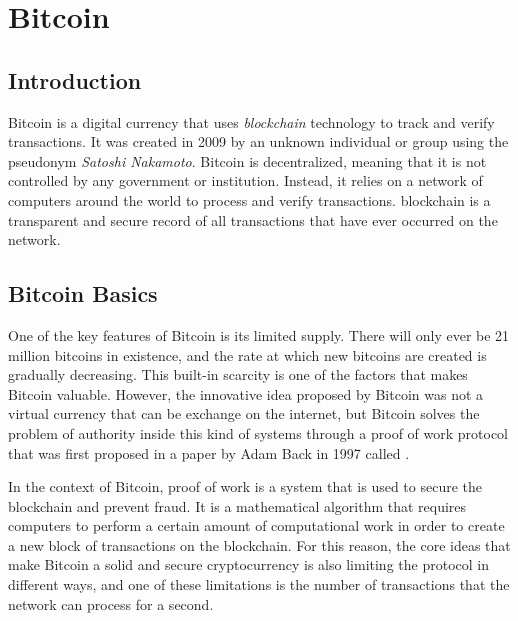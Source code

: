 \newcommand{\noteOnBitcoinNaming}[0]{\footnote{
    From now till the end of the document we will use the word Bitcoin capitalized to identify the protocol,
    and the word bitcoin not capitalized to identify the currency
    }
}

\setcounter{page}{1}
\chapter{Bitcoin}

\section{Introduction}

Bitcoin is a digital currency that uses \emph{blockchain} technology to track
and verify transactions. It was created in 2009 by an unknown individual or
group using the pseudonym \emph{Satoshi Nakamoto}.
Bitcoin is decentralized, meaning that it is not controlled by any government
or institution. Instead, it relies on a network of computers around the world
to process and verify transactions.
blockchain is a transparent and secure record of all transactions that have
ever occurred on the network.

\section{Bitcoin Basics}
\label{sec:basics}

One of the key features of Bitcoin is its limited supply. There will only ever
be 21 million bitcoins in existence, and the rate at which new bitcoins are
created is gradually decreasing. This built-in scarcity is one of the factors
that makes Bitcoin valuable.
However, the innovative idea proposed by Bitcoin was not a virtual currency that can be
exchange on the internet, but Bitcoin solves the problem of authority inside this kind
of systems through a proof of work protocol that was first proposed in a paper
by Adam Back in 1997 called  \cite{hashcash}.

In the context of Bitcoin, proof of work is a system that is used to secure the
blockchain and prevent fraud. It is a mathematical algorithm that requires computers
to perform a certain amount of computational work in order to create a new
block of transactions on the blockchain.
For this reason, the core ideas that make Bitcoin a solid and secure cryptocurrency 
is also limiting the protocol in different ways, and one of these limitations is the number of
transactions that the network can process for a second.

